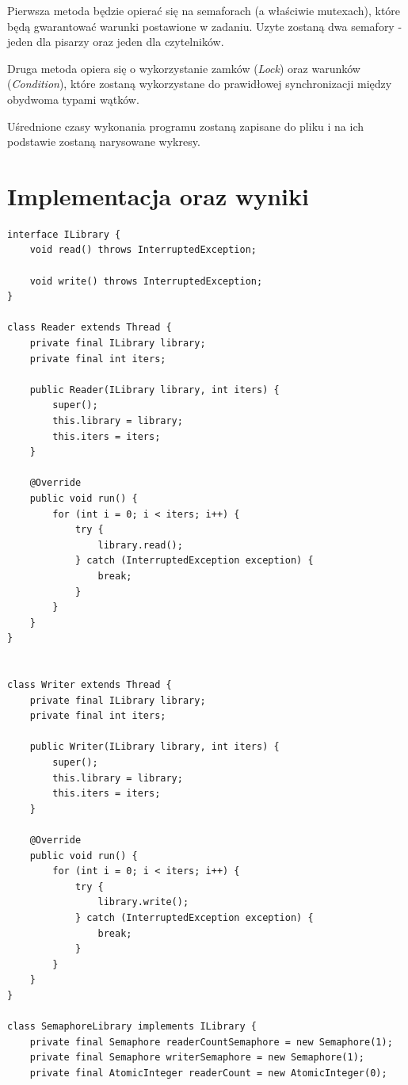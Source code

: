 \documentclass[12pt]{article}
\begin{document}
Pierwsza metoda będzie opierać się na semaforach (a właściwie mutexach), które będą gwarantować warunki postawione w zadaniu. Uzyte zostaną dwa semafory - jeden dla pisarzy oraz jeden dla czytelników.

Druga metoda opiera się o wykorzystanie zamków (\emph{Lock}) oraz warunków  (\emph{Condition}), które zostaną wykorzystane do prawidłowej synchronizacji między obydwoma typami wątków.

Uśrednione czasy wykonania programu zostaną zapisane do pliku i na ich podstawie zostaną narysowane wykresy. 


\section{Implementacja oraz wyniki}
\begin{verbatim}
interface ILibrary {
    void read() throws InterruptedException;

    void write() throws InterruptedException;
}

class Reader extends Thread {
    private final ILibrary library;
    private final int iters;

    public Reader(ILibrary library, int iters) {
        super();
        this.library = library;
        this.iters = iters;
    }

    @Override
    public void run() {
        for (int i = 0; i < iters; i++) {
            try {
                library.read();
            } catch (InterruptedException exception) {
                break;
            }
        }
    }
}


class Writer extends Thread {
    private final ILibrary library;
    private final int iters;

    public Writer(ILibrary library, int iters) {
        super();
        this.library = library;
        this.iters = iters;
    }

    @Override
    public void run() {
        for (int i = 0; i < iters; i++) {
            try {
                library.write();
            } catch (InterruptedException exception) {
                break;
            }
        }
    }
}

class SemaphoreLibrary implements ILibrary {
    private final Semaphore readerCountSemaphore = new Semaphore(1);
    private final Semaphore writerSemaphore = new Semaphore(1);
    private final AtomicInteger readerCount = new AtomicInteger(0);


\end{verbatim}
\end{document}
